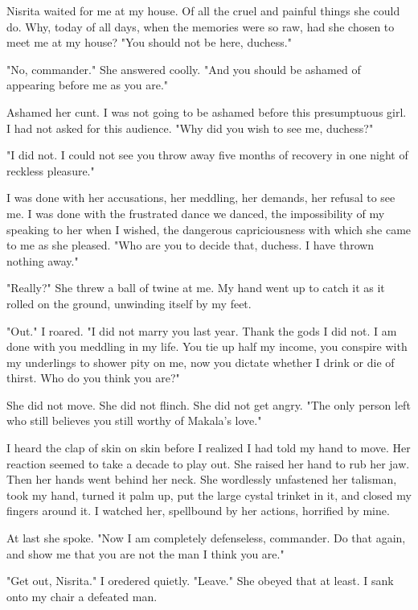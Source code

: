 \documentclass{article}
\begin{document}
Nisrita waited for me at my house. Of all the cruel and painful things she could do. Why, today of all days, when the memories were so raw, had she chosen to meet me at my house? "You should not be here, duchess."

"No, commander." She answered coolly. "And you should be ashamed of appearing before me as you are."

Ashamed her cunt. I was not going to be ashamed before this presumptuous girl. I had not asked for this audience. "Why did you wish to see me, duchess?"

"I did not. I could not see you throw away five months of recovery in one night of reckless pleasure."

I was done with her accusations, her meddling, her demands, her refusal to see me. I was done with the frustrated dance we danced, the impossibility of my speaking to her when I wished, the dangerous capriciousness with which she came to me as she pleased. "Who are you to decide that, duchess. I have thrown nothing away."

"Really?" She threw a ball of twine at me. My hand went up to catch it as it rolled on the ground, unwinding itself by my feet. 

"Out." I roared. "I did not marry you last year. Thank the gods I did not. I am done with you meddling in my life. You tie up half my income, you conspire with my underlings to shower pity on me, now you dictate whether I drink or die of thirst. Who do you think you are?"

She did not move. She did not flinch. She did not get angry. "The only person left who still believes you still worthy of Makala's love."

I heard the clap of skin on skin before I realized I had told my hand to move. Her reaction seemed to take a decade to play out. She raised her hand to rub her jaw. Then her hands went behind her neck. She wordlessly unfastened her talisman, took my hand, turned it palm up, put the large cystal trinket in it, and closed my fingers around it. I watched her, spellbound by her actions, horrified by mine.

At last she spoke. "Now I am completely defenseless, commander. Do that again, and show me that you are not the man I think you are."

"Get out, Nisrita." I oredered quietly. "Leave." She obeyed that at least. I sank onto my chair a defeated man. 
 
\vspace{.5 cm}
\end{document}
